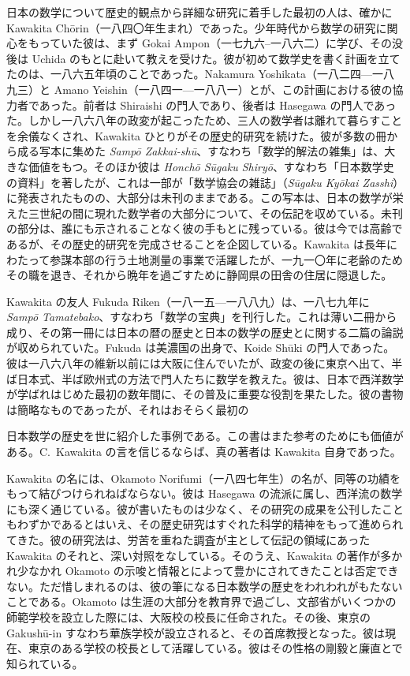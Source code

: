 \documentclass[11pt]{article}
\newcommand{\scanpage}[2]{\clearpage\setcounter{footnote}{0}\noindent{\footnotesize\color{gray}PDF #1 頁 · #2}\par\medskip}
\begin{document}
日本の数学について歴史的観点から詳細な研究に着手した最初の人は、確かに Kawakita Chōrin（一八四〇年生まれ）であった。少年時代から数学の研究に関心をもっていた彼は、まず Gokai Ampon（一七九六--一八六二）に学び、その没後は Uchida のもとに赴いて教えを受けた。彼が初めて数学史を書く計画を立てたのは、一八六五年頃のことであった。Nakamura Yoshikata（一八二四---一八九三）と Amano Yeishin（一八四一---一八八一）とが、この計画における彼の協力者であった。前者は Shiraishi の門人であり、後者は Hasegawa の門人であった。しかし一八六八年の政変が起こったため、三人の数学者は離れて暮らすことを余儀なくされ、Kawakita ひとりがその歴史的研究を続けた。彼が多数の冊から成る写本に集めた \emph{Sampō Zakkai-shū}、すなわち「数学的解法の雑集」は、大きな価値をもつ。そのほか彼は \emph{Honchō Sūgaku Shiryō}、すなわち「日本数学史の資料」を著したが、これは一部が「数学協会の雑誌」（\emph{Sūgaku Kyōkai Zasshi}）に発表されたものの、大部分は未刊のままである。この写本は、日本の数学が栄えた三世紀の間に現れた数学者の大部分について、その伝記を収めている。未刊の部分は、誰にも示されることなく彼の手もとに残っている。彼は今では高齢であるが、その歴史的研究を完成させることを企図している。Kawakita は長年にわたって参謀本部の行う土地測量の事業で活躍したが、一九一〇年に老齢のためその職を退き、それから晩年を過ごすために静岡県の田舎の住居に隠退した。

Kawakita の友人 Fukuda Riken（一八一五---一八八九）は、一八七九年に \emph{Sampō Tamatebako}、すなわち「数学の宝典」を刊行した。これは薄い二冊から成り、その第一冊には日本の暦の歴史と日本の数学の歴史とに関する二篇の論説が収められていた。Fukuda は美濃国の出身で、Koide Shūki の門人であった。彼は一八六八年の維新以前には大阪に住んでいたが、政変の後に東京へ出て、半ば日本式、半ば欧州式の方法で門人たちに数学を教えた。彼は、日本で西洋数学が学ばれはじめた最初の数年間に、その普及に重要な役割を果たした。彼の書物は簡略なものであったが、それはおそらく最初の

\scanpage{0341}{印刷頁 327}
\noindent 日本数学の歴史を世に紹介した事例である。この書はまた参考のためにも価値がある。C.~Kawakita の言を信じるならば、真の著者は Kawakita 自身であった。

Kawakita の名には、Okamoto Norifumi（一八四七年生）の名が、同等の功績をもって結びつけられねばならない。彼は Hasegawa の流派に属し、西洋流の数学にも深く通じている。彼が書いたものは少なく、その研究の成果を公刊したこともわずかであるとはいえ、その歴史研究はすぐれた科学的精神をもって進められてきた。彼の研究法は、労苦を重ねた調査が主として伝記の領域にあった Kawakita のそれと、深い対照をなしている。そのうえ、Kawakita の著作が多かれ少なかれ Okamoto の示唆と情報とによって豊かにされてきたことは否定できない。ただ惜しまれるのは、彼の筆になる日本数学の歴史をわれわれがもたないことである。Okamoto は生涯の大部分を教育界で過ごし、文部省がいくつかの師範学校を設立した際には、大阪校の校長に任命された。その後、東京の Gakushū-in すなわち華族学校が設立されると、その首席教授となった。彼は現在、東京のある学校の校長として活躍している。彼はその性格の剛毅と廉直とで知られている。
\end{document}
